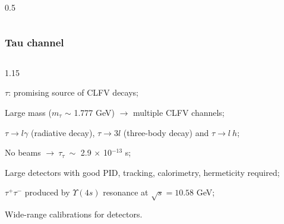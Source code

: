 \documentclass{beamer}
\begin{document}
\begin{frame}
\begin{columns}
\begin{column}{0.5\framewidth}
\begin{figure}[!h]
                \label{fig:comet}
                \end{figure}
    \end{column}
\end{columns}
    \end{frame}


   









\begin{frame}
    \frametitle{Tau channel}
    \vspace{-3mm}
    \begin{columns}
     \begin{column}{1.15\framewidth}
     \setlength{\leftmargini}{1.1em}
    
        \begin{itemize}
       {\small     \item  $\tau$: promising source of CLFV decays;
       \vspace{1mm}
       \item Large mass ($m_\tau$ $\sim$ 1.777 GeV) $\rightarrow$ multiple CLFV channels;
       \vspace{1mm}

       \item $\tau \rightarrow l \gamma$ (radiative decay), $\tau \rightarrow 3l$ (three-body decay) 
       and $\tau\rightarrow l \ h$;
       \vspace{1mm}

            \item No beams $\rightarrow \ \tau_\tau \ \sim$ 2.9 $\times$ 10$^{-13}$ s;
            \vspace{1mm}

\item    Large detectors with good PID, tracking, calorimetry, hermeticity required; 
\vspace{1mm}

\item $\tau^+ \tau^-$ produced by $\Upsilon(4s)$ resonance at $\sqrt{s}=10.58$ GeV;
\vspace{1mm}

        \item Wide-range calibrations for detectors.  
       }
    \end{itemize}
\end{column}
\end{columns}
   

\end{frame}
\end{document}
